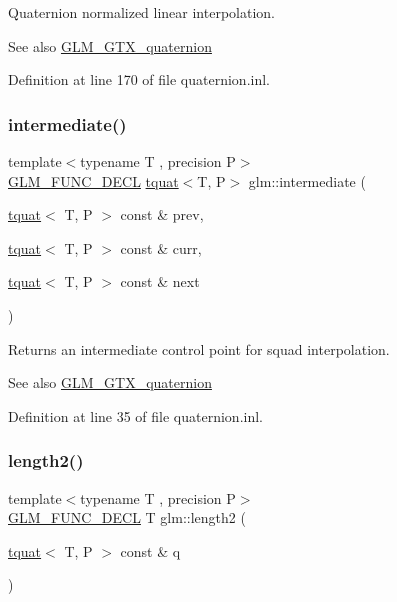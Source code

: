 Quaternion normalized linear interpolation.

\begin{DoxySeeAlso}{See also}
\mbox{\hyperlink{group__gtx__quaternion}{G\+L\+M\+\_\+\+G\+T\+X\+\_\+quaternion}} 
\end{DoxySeeAlso}


Definition at line 170 of file quaternion.\+inl.

\mbox{\label{group__gtx__quaternion_ga56abae85b3669c866e91f3c57b298b9c}} 
\subsubsection{\texorpdfstring{intermediate()}{intermediate()}}
{\footnotesize\ttfamily template$<$typename T , precision P$>$ \\
\mbox{\hyperlink{setup_8hpp_ab2d052de21a70539923e9bcbf6e83a51}{G\+L\+M\+\_\+\+F\+U\+N\+C\+\_\+\+D\+E\+CL}} \mbox{\hyperlink{structglm_1_1tquat}{tquat}}$<$T, P$>$ glm\+::intermediate (\begin{DoxyParamCaption}\item[{\mbox{\hyperlink{structglm_1_1tquat}{tquat}}$<$ T, P $>$ const \&}]{prev,  }\item[{\mbox{\hyperlink{structglm_1_1tquat}{tquat}}$<$ T, P $>$ const \&}]{curr,  }\item[{\mbox{\hyperlink{structglm_1_1tquat}{tquat}}$<$ T, P $>$ const \&}]{next }\end{DoxyParamCaption})}

Returns an intermediate control point for squad interpolation.

\begin{DoxySeeAlso}{See also}
\mbox{\hyperlink{group__gtx__quaternion}{G\+L\+M\+\_\+\+G\+T\+X\+\_\+quaternion}} 
\end{DoxySeeAlso}


Definition at line 35 of file quaternion.\+inl.

\mbox{\label{group__gtx__quaternion_ga02b45352c7ac345cabc9e877314acda6}} 
\subsubsection{\texorpdfstring{length2()}{length2()}}
{\footnotesize\ttfamily template$<$typename T , precision P$>$ \\
\mbox{\hyperlink{setup_8hpp_ab2d052de21a70539923e9bcbf6e83a51}{G\+L\+M\+\_\+\+F\+U\+N\+C\+\_\+\+D\+E\+CL}} T glm\+::length2 (\begin{DoxyParamCaption}\item[{\mbox{\hyperlink{structglm_1_1tquat}{tquat}}$<$ T, P $>$ const \&}]{q }\end{DoxyParamCaption})}

